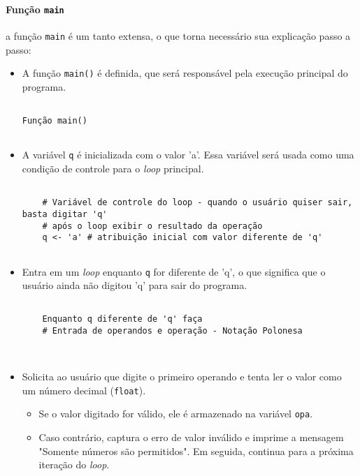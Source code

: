\documentclass[a4paper, 12pt, onecolumn,singlespacing]{article}
\begin{document}
\paragraph{Função \texttt{main}} a função \texttt{main} é um tanto extensa, o que torna necessário sua explicação passo a passo:

\begin{itemize}
	\item A função \texttt{main()} é definida, que será responsável pela execução principal do programa.

\begin{verbatim}
		
Função main()
	
\end{verbatim}

	\item A variável \texttt{q} é inicializada com o valor 'a'. Essa variável será usada como uma condição de controle para o \textit{loop} principal.
	
\begin{verbatim}
		
	# Variável de controle do loop - quando o usuário quiser sair, basta digitar 'q'
	# após o loop exibir o resultado da operação
	q <- 'a' # atribuição inicial com valor diferente de 'q'
	
\end{verbatim}
	
	\item Entra em um \textit{loop} enquanto \texttt{q} for diferente de 'q', o que significa que o usuário ainda não digitou 'q' para sair do programa.

\begin{verbatim}
	
	Enquanto q diferente de 'q' faça
	# Entrada de operandos e operação - Notação Polonesa

	
\end{verbatim}

	\item Solicita ao usuário que digite o primeiro operando e tenta ler o valor como um número decimal (\texttt{float}).
	\begin{itemize}
		\item Se o valor digitado for válido, ele é armazenado na variável \texttt{opa}.
		\item Caso contrário, captura o erro de valor inválido e imprime a mensagem "Somente números são permitidos". Em seguida, continua para a próxima iteração do \textit{loop}.
	\end{itemize}
\begin{verbatim}


\end{verbatim}
\end{itemize}
\end{document}
